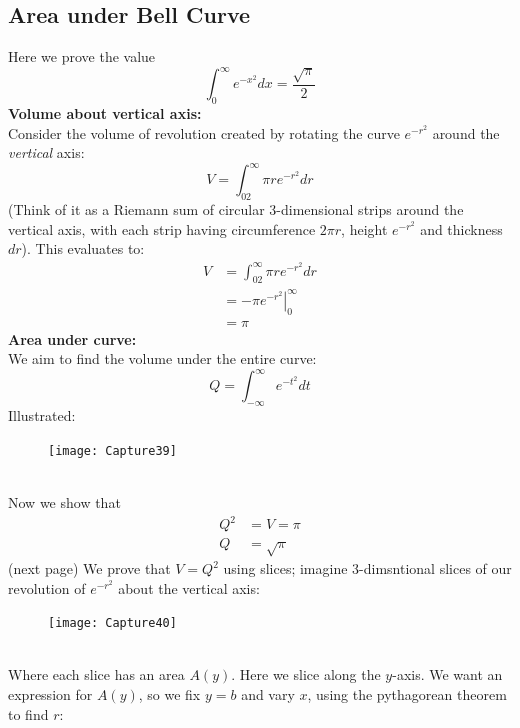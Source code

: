 \documentclass{report}
\begin{document}
\subsection{Area under Bell Curve}%
Here we prove the value
\begin{equation*}
\int^{\infty}_0e^{-x^2}dx=\frac{\sqrt{\pi}}{2}
\end{equation*}
\textbf{Volume about vertical axis:}\\
Consider the volume of revolution created by rotating the curve $e^{-r^2}$ around the \textit{vertical} axis:
\begin{equation*}
V=\int^{\infty}_02\pi re^{-r^2}dr
\end{equation*}
(Think of it as a Riemann sum of circular 3-dimensional strips around the vertical axis,
with each strip having circumference $2\pi r$, height $e^{-r^2}$ and thickness $dr$). 
This evaluates to:
\begin{align*}
V&=\int^{\infty}_02\pi re^{-r^2}dr\\
&=\left.-\pi e^{-r^2}\right|_0^\infty\\
&=\pi
\end{align*}
\textbf{Area under curve:}\\
We aim to find the volume under the entire curve:
\begin{equation*}
Q=\int_{-\infty}^{\infty}e^{-t^2}dt
\end{equation*}
Illustrated:
\begin{figure}[h]
\texttt{[image: Capture39]}\\
\centering
{}
\end{figure}\\
Now we show that
\begin{align*}
Q^2&=V=\pi\\
Q&=\sqrt{\pi}
\end{align*}
(next page)
\newpage
\noindent We prove that $V=Q^2$ using slices; imagine 3-dimsntional slices of our 
revolution of $e^{-r^2}$ about the vertical axis:
\begin{figure}[h]
\texttt{[image: Capture40]}\\
\centering
{}
\end{figure}\\
Where each slice has an area $A(y)$.
Here we slice along the $y$-axis. We want an expression for $A(y)$, so we fix $y=b$ 
and vary $x$, using the pythagorean theorem to find $r$:
\end{document}
